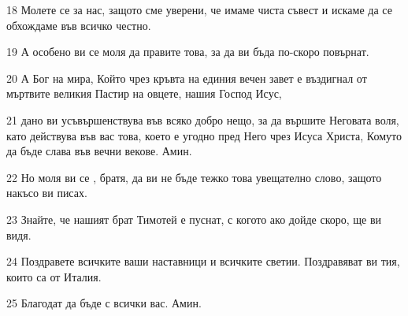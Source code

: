 \par 18 Молете се за нас, защото сме уверени, че имаме чиста съвест и искаме да се обхождаме във всичко честно.
\par 19 А особено ви се моля да правите това, за да ви бъда по-скоро повърнат.
\par 20 А Бог на мира, Който чрез кръвта на единия вечен завет е въздигнал от мъртвите великия Пастир на овцете, нашия Господ Исус,
\par 21 дано ви усъвършенствува във всяко добро нещо, за да вършите Неговата воля, като действува във вас това, което е угодно пред Него чрез Исуса Христа, Комуто да бъде слава във вечни векове. Амин.
\par 22 Но моля ви се , братя, да ви не бъде тежко това увещателно слово, защото накъсо ви писах.
\par 23 Знайте, че нашият брат Тимотей е пуснат, с когото ако дойде скоро, ще ви видя.
\par 24 Поздравете всичките ваши наставници и всичките светии. Поздравяват ви тия, които са от Италия.
\par 25 Благодат да бъде с всички вас. Амин.

